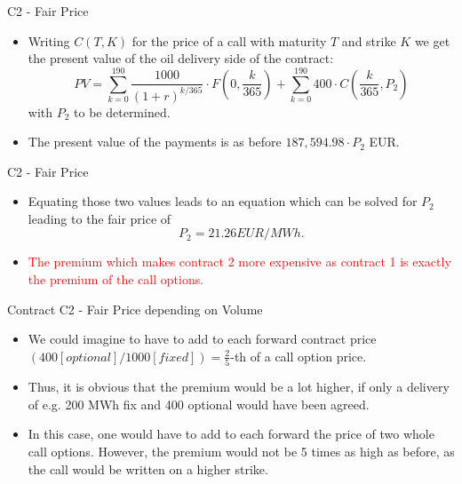 {C2 - Fair Price}
\begin{itemize}
\item<1->
Writing $C(T,K)$ for the price of a call with maturity $T$ and strike $K$ we get the present value of the oil delivery side of the contract:
$$
	PV = \sum_{k=0}^{190} \frac{1000}{(1+r)^{k/365}} \cdot F(0,\frac k {365}) + \sum_{k=0}^{190} 400 \cdot C(\frac k {365},P_2)
$$
with $P_2$ to be determined.
\item<2-> The present value of the payments is as before $187,594.98 \cdot P_2$ EUR.
\end{itemize}



{C2 - Fair Price}
\begin{itemize}
\item<1->
Equating those two values leads to an equation which can be solved for $P_2$ leading to the fair price of
$$
	P_2 = 21.26 EUR/MWh.
$$
\item<2->
\textcolor{red}{The premium which makes contract 2 more expensive as contract 1 is exactly the premium of the call options.}
\end{itemize}



{Contract C2 - Fair Price depending on Volume}
\begin{itemize}
\item<1-> We could imagine to have to add to each forward contract price $(400 [optional]/1000 [fixed]) = \frac 2 5$-th of a call option price.
\item<2-> Thus, it is obvious that the premium would be a lot higher, if only a delivery of e.g. 200 MWh fix and 400 optional would have been agreed.
\item<3-> In this case, one would have to add to each forward the price of two whole call options. However, the premium would not be 5 times as high as before, as the call would be written on a higher strike.
\end{itemize}




